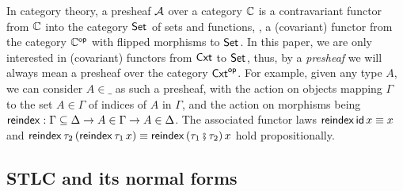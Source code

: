 \documentclass[sigconf,screen,fleqn]{acmart} %
\begin{document}
In category theory, a presheaf $\mathcal{A}$ over a category $\mathbb{C}$ is a contravariant
functor from $\mathbb{C}$ into the category $\mathsf{Set}_{}$ of sets and functions, \ie, a
(covariant) functor from the category $\mathbb{C}^{\mathsf{op}}$ with flipped morphisms
to $\mathsf{Set}_{}$.
In this paper, we are only interested in (covariant) functors from $\mathsf{Cxt}$ to
$\mathsf{Set}_{}$, thus,
by a \emph{presheaf} we will always mean a presheaf over the category $\mathsf{Cxt}^{\mathsf{op}}$.
For example, given any type $A$, we can
consider $A{\in}\_$ as such a presheaf, with the action on objects mapping $\Gamma$
to the set $A \in \Gamma$ of indices of $A$ in $\Gamma$, and the action on morphisms
being
$\mathsf{reindex} : \Gamma \subseteq \Delta \to A \in \Gamma \to A \in
\Delta$.  The associated functor laws $\mathsf{reindex}\,\mathsf{id}\,x \equiv x$ and
$\mathsf{reindex}\,\tau_2\,(\mathsf{reindex}\,\tau_1\,x) \equiv \mathsf{reindex}\,(\tau_1 \fatsemi
\tau_2)\,x$ hold propositionally.

\subsection{STLC and its normal forms}
\label{sec:stlc}
\end{document}
